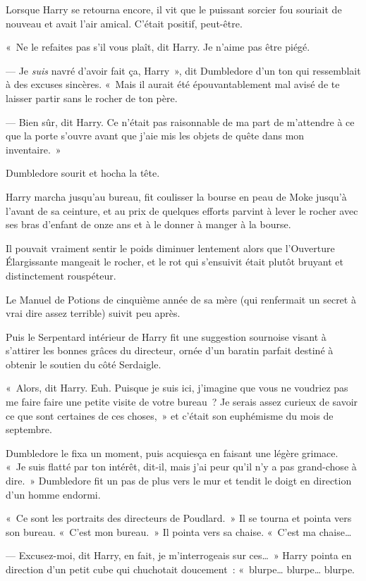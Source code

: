 Lorsque Harry se retourna encore, il vit que le puissant sorcier fou souriait de nouveau et avait l'air amical. C'était positif, peut-être.

«~Ne le refaites pas s'il vous plaît, dit Harry. Je n'aime pas être piégé.

--- Je \emph{suis} navré d'avoir fait ça, Harry~», dit Dumbledore d'un ton qui ressemblait à des excuses sincères. «~Mais il aurait été épouvantablement mal avisé de te laisser partir sans le rocher de ton père.

--- Bien sûr, dit Harry. Ce n'était pas raisonnable de ma part de m'attendre à ce que la porte s'ouvre avant que j'aie mis les objets de quête dans mon inventaire.~»

Dumbledore sourit et hocha la tête.

Harry marcha jusqu'au bureau, fit coulisser la bourse en peau de Moke jusqu'à l'avant de sa ceinture, et au prix de quelques efforts parvint à lever le rocher avec ses bras d'enfant de onze ans et à le donner à manger à la bourse.

Il pouvait vraiment sentir le poids diminuer lentement alors que l'Ouverture Élargissante mangeait le rocher, et le rot qui s'ensuivit était plutôt bruyant et distinctement rouspéteur.

Le Manuel de Potions de cinquième année de sa mère (qui renfermait un secret à vrai dire assez terrible) suivit peu après.

Puis le Serpentard intérieur de Harry fit une suggestion sournoise visant à s'attirer les bonnes grâces du directeur, ornée d'un baratin parfait destiné à obtenir le soutien du côté Serdaigle.

«~Alors, dit Harry. Euh. Puisque je suis ici, j'imagine que vous ne voudriez pas me faire faire une petite visite de votre bureau~? Je serais assez curieux de savoir ce que sont certaines de ces choses,~» et c'était son euphémisme du mois de septembre.

Dumbledore le fixa un moment, puis acquiesça en faisant une légère grimace. «~Je suis flatté par ton intérêt, dit-il, mais j'ai peur qu'il n'y a pas grand-chose à dire.~» Dumbledore fit un pas de plus vers le mur et tendit le doigt en direction d'un homme endormi.

«~Ce sont les portraits des directeurs de Poudlard.~» Il se tourna et pointa vers son bureau. «~C'est mon bureau.~» Il pointa vers sa chaise. «~C'est ma chaise…

--- Excusez-moi, dit Harry, en fait, je m'interrogeais sur ces…~» Harry pointa en direction d'un petit cube qui chuchotait doucement~: «~blurpe… blurpe… blurpe.

